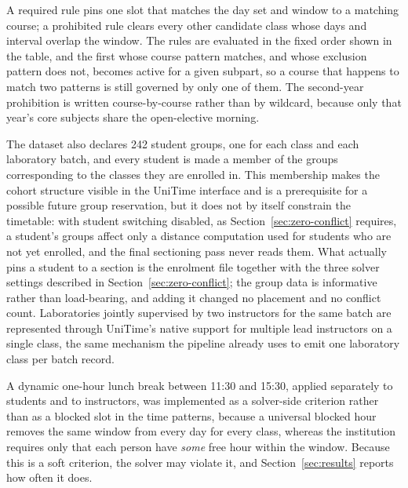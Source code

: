 \documentclass[journal]{IEEEtran}
\begin{document}
A required rule pins one slot that matches the day set and window to a matching course; a prohibited rule clears every other candidate class whose days and interval overlap the window. The rules are evaluated in the fixed order shown in the table, and the first whose course pattern matches, and whose exclusion pattern does not, becomes active for a given subpart, so a course that happens to match two patterns is still governed by only one of them. The second-year prohibition is written course-by-course rather than by wildcard, because only that year's core subjects share the open-elective morning.

The dataset also declares 242 student groups, one for each class and each laboratory batch, and every student is made a member of the groups corresponding to the classes they are enrolled in. This membership makes the cohort structure visible in the UniTime interface and is a prerequisite for a possible future group reservation, but it does not by itself constrain the timetable: with student switching disabled, as Section~\ref{sec:zero-conflict} requires, a student's groups affect only a distance computation used for students who are not yet enrolled, and the final sectioning pass never reads them. What actually pins a student to a section is the enrolment file together with the three solver settings described in Section~\ref{sec:zero-conflict}; the group data is informative rather than load-bearing, and adding it changed no placement and no conflict count. Laboratories jointly supervised by two instructors for the same batch are represented through UniTime's native support for multiple lead instructors on a single class, the same mechanism the pipeline already uses to emit one laboratory class per batch record.

A dynamic one-hour lunch break between 11:30 and 15:30, applied separately to students and to instructors, was implemented as a solver-side criterion rather than as a blocked slot in the time patterns, because a universal blocked hour removes the same window from every day for every class, whereas the institution requires only that each person have \emph{some} free hour within the window. Because this is a soft criterion, the solver may violate it, and Section~\ref{sec:results} reports how often it does.
\end{document}
